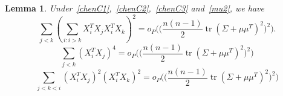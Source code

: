 \documentclass[review]{elsarticle}
\DeclareMathOperator{\mytr}{tr}
\theoremstyle{plain}
\newtheorem{lemma}{Lemma}
\theoremstyle{definition}
\theoremstyle{remark}
\begin{document}
\begin{lemma}
    Under~\eqref{chenC1},~\eqref{chenC2},~\eqref{chenC3} and~\eqref{mu2},
we have
    \begin{equation}\label{lemma2R1}
        \sum_{j<k}{(\sum_{i:i>k}X_i^T X_j X_i^T X_k)}^2
        =o_P\Big(\big(\frac{n(n-1)}{2}\mytr (\Sigma+\mu\mu^T)^2\big)^2\Big).
    \end{equation}
    \begin{equation}\label{lemma2R2}
        \sum_{j<k}{(X_i^T X_j)}^4=o_P\Big(\big(\frac{n(n-1)}{2}\mytr (\Sigma+\mu\mu^T)^2\big)^2\Big)
    \end{equation}
    \begin{equation}\label{lemma2R3}
        \sum_{j<k<i}{(X_i^T X_j)}^2{(X_i^T X_k)}^2 =o_P\Big(\big(\frac{n(n-1)}{2}\mytr (\Sigma+\mu\mu^T)^2\big)^2\Big)
    \end{equation}
\end{lemma}
\end{document}
